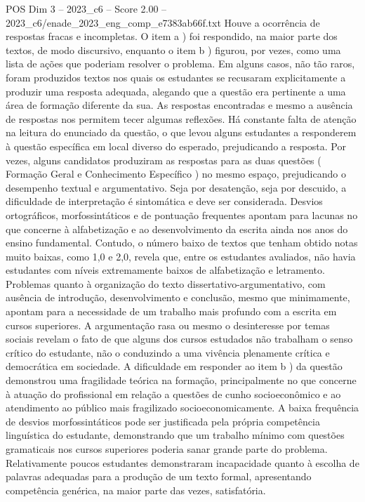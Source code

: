 \begin{textsample}{POS Dim 3 – 2023\_c6 – Score 2.00 – 2023\_c6/enade\_2023\_eng\_comp\_e7383ab66f.txt}
Houve a ocorrência de respostas fracas e incompletas.
O item a ) foi respondido, na maior parte dos textos, de modo discursivo, enquanto o item b ) figurou, por vezes, como uma lista de ações que poderiam resolver o problema.
Em alguns casos, não tão raros, foram produzidos textos nos quais os estudantes se recusaram explicitamente a produzir uma resposta adequada, alegando que a questão era pertinente a uma área de formação diferente da sua.
As respostas encontradas e mesmo a ausência de respostas nos permitem tecer algumas reflexões.
Há constante falta de atenção na leitura do enunciado da questão, o que levou alguns estudantes a responderem à questão específica em local diverso do esperado, prejudicando a resposta.
Por vezes, alguns candidatos produziram as respostas para as duas questões ( Formação Geral e Conhecimento Específico ) no mesmo espaço, prejudicando o desempenho textual e argumentativo.
Seja por desatenção, seja por descuido, a dificuldade de interpretação é sintomática e deve ser considerada.
Desvios ortográficos, morfossintáticos e de pontuação frequentes apontam para lacunas no que concerne à alfabetização e ao desenvolvimento da escrita ainda nos anos do ensino fundamental.
Contudo, o número baixo de textos que tenham obtido notas muito baixas, como 1,0 e 2,0, revela que, entre os estudantes avaliados, não havia estudantes com níveis extremamente baixos de alfabetização e letramento.
Problemas quanto à organização do texto dissertativo-argumentativo, com ausência de introdução, desenvolvimento e conclusão, mesmo que minimamente, apontam para a necessidade de um trabalho mais profundo com a escrita em cursos superiores.
A argumentação rasa ou mesmo o desinteresse por temas sociais revelam o fato de que alguns dos cursos estudados não trabalham o senso crítico do estudante, não o conduzindo a uma vivência plenamente crítica e democrática em sociedade.
A dificuldade em responder ao item b ) da questão demonstrou uma fragilidade teórica na formação, principalmente no que concerne à atuação do profissional em relação a questões de cunho socioeconômico e ao atendimento ao público mais fragilizado socioeconomicamente.
A baixa frequência de desvios morfossintáticos pode ser justificada pela própria competência linguística do estudante, demonstrando que um trabalho mínimo com questões gramaticais nos cursos superiores poderia sanar grande parte do problema.
Relativamente poucos estudantes demonstraram incapacidade quanto à escolha de palavras adequadas para a produção de um texto formal, apresentando competência genérica, na maior parte das vezes, satisfatória.

\end{textsample}
